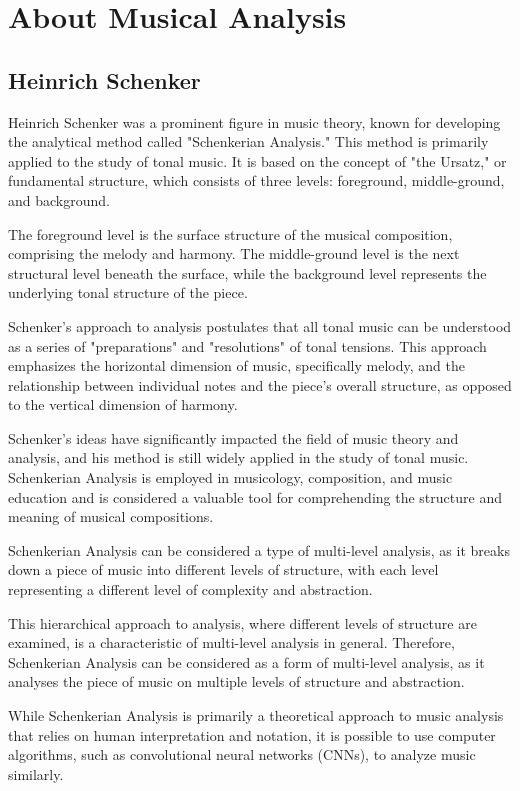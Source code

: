\chapter{About Musical Analysis}

\section{Heinrich Schenker}

Heinrich Schenker was a prominent figure in music theory, known for developing the analytical method called "Schenkerian Analysis." This method is primarily applied to the study of tonal music. It is based on the concept of "the Ursatz," or fundamental structure, which consists of three levels: foreground, middle-ground, and background.

The foreground level is the surface structure of the musical composition, comprising the melody and harmony. The middle-ground level is the next structural level beneath the surface, while the background level represents the underlying tonal structure of the piece.

Schenker's approach to analysis postulates that all tonal music can be understood as a series of "preparations" and "resolutions" of tonal tensions. This approach emphasizes the horizontal dimension of music, specifically melody, and the relationship between individual notes and the piece's overall structure, as opposed to the vertical dimension of harmony.

Schenker's ideas have significantly impacted the field of music theory and analysis, and his method is still widely applied in the study of tonal music. Schenkerian Analysis is employed in musicology, composition, and music education and is considered a valuable tool for comprehending the structure and meaning of musical compositions.

Schenkerian Analysis can be considered a type of multi-level analysis, as it breaks down a piece of music into different levels of structure, with each level representing a different level of complexity and abstraction.

This hierarchical approach to analysis, where different levels of structure are examined, is a characteristic of multi-level analysis in general. Therefore, Schenkerian Analysis can be considered as a form of multi-level analysis, as it analyses the piece of music on multiple levels of structure and abstraction.

While Schenkerian Analysis is primarily a theoretical approach to music analysis that relies on human interpretation and notation, it is possible to use computer algorithms, such as convolutional neural networks (CNNs), to analyze music similarly.

